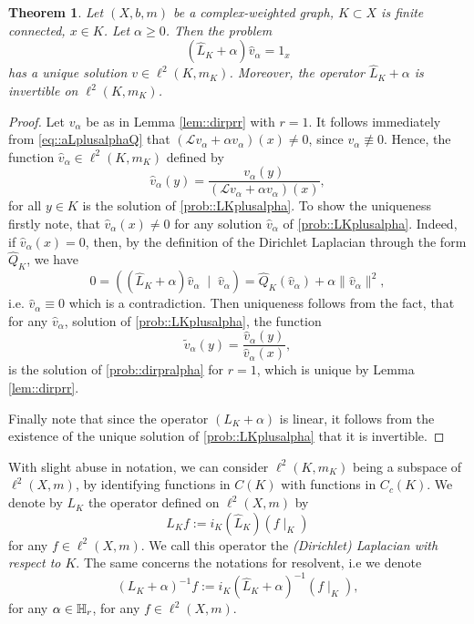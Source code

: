 \documentclass[a4paper,11pt]{amsart}
\newtheorem{theorem}{Theorem}[section]
\theoremstyle{definition}
\renewcommand{\L}{\mathcal{L}}
\begin{document}
\begin{theorem}\label{LKinvert}
Let $(X,b,m)$ be a complex-weighted graph, $K\subset X$ is finite connected, $x\in K$. Let $\alpha\ge 0$. Then the problem
\begin{equation}\label{prob::LKplusalpha}
(\widehat L_K+\alpha)\widehat v_\alpha=1_x
\end{equation}
has a unique solution $v\in \ell^2(K,m_K)$.  Moreover, the operator $\widehat L_K+\alpha$ is invertible on $\ell^2(K,m_K)$.
\end{theorem}
\begin{proof}
Let $v_\alpha$ be as in Lemma \ref{lem::dirprr} with $r=1$.
It follows immediately from  \eqref{eq::aLplusalphaQ} that $(\L  v_\alpha+ \alpha  v_\alpha)(x)\ne 0$,  since $v_\alpha\not\equiv 0$.
Hence, the function $\widehat v_\alpha\in \ell^2(K,m_K)$ defined by
$$
\widehat v_\alpha(y)=\dfrac{v_\alpha(y)}{(\L   v_\alpha+\alpha  v_\alpha)(x)},
$$
for all $y\in K$ is the solution of \eqref{prob::LKplusalpha}. To show the uniqueness firstly note, that $\widehat v_\alpha(x)\ne 0$ for any solution $\widehat v_\alpha$ of \eqref{prob::LKplusalpha}. Indeed, if $\widehat v_\alpha(x)=0$, then, by the definition of the Dirichlet Laplacian through the form $\widehat  Q_K$, we have
$$
0=((\widehat  L_K+\alpha)\widehat v_\alpha\;\mid\;\widehat v_\alpha)=\widehat  Q_K(\widehat v_\alpha)+\alpha \|\widehat v_\alpha\|^2,
$$
i.e. $\widehat v_\alpha\equiv 0$ which is a contradiction. Then uniqueness follows from the fact, that for any $\widehat v_\alpha$, solution of  \eqref{prob::LKplusalpha}, the function 
$$
 \widetilde v_\alpha(y)=\dfrac{\widehat v_\alpha(y)}{\widehat v_\alpha(x)},
$$
is the solution of \eqref{prob::dirpralpha} for $r=1$, which is unique by  Lemma \ref{lem::dirprr}.


Finally note that since the operator $(L_K+\alpha)$ is linear, it follows from  the existence of the unique solution of \eqref{prob::LKplusalpha} that it is  invertible.
\end{proof}




%
With slight abuse in notation, we can consider  $\ell^2(K,m_K)$ being a subspace of $\ell^2(X,m)$, by identifying functions in $C(K)$ with functions in $C_c(K)$.
We denote by $L_K$ the operator defined on $\ell^2(X,m)$ by
\begin{equation}\label{eq::LK}
L_Kf:=i_K(\widehat L_K)(f\mid_K)
\end{equation}
for any $f\in \ell^2(X,m)$. We call this operator the {\em (Dirichlet) Laplacian with respect to $K$}.
The same concerns the notations for resolvent, i.e we denote
\begin{equation}\label{eq::LKres}
(L_K+\alpha)^{-1}f:=i_K(\widehat L_K+\alpha)^{-1}(f\mid_K),
\end{equation}
for any $\alpha\in \Bbb H_r$, for any   $f\in \ell^2(X,m)$.
\end{document}
